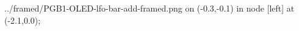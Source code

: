 \documentclass[preview]{standalone}
\begin{document}
\begin{zoomed}{../framed/PGB1-OLED-lfo-bar-add-framed.png}
  \spy [gray, size=1.2cm] on (-0.3,-0.1) in node [left] at (-2.1,0.0);
\end{zoomed}
\end{document}
